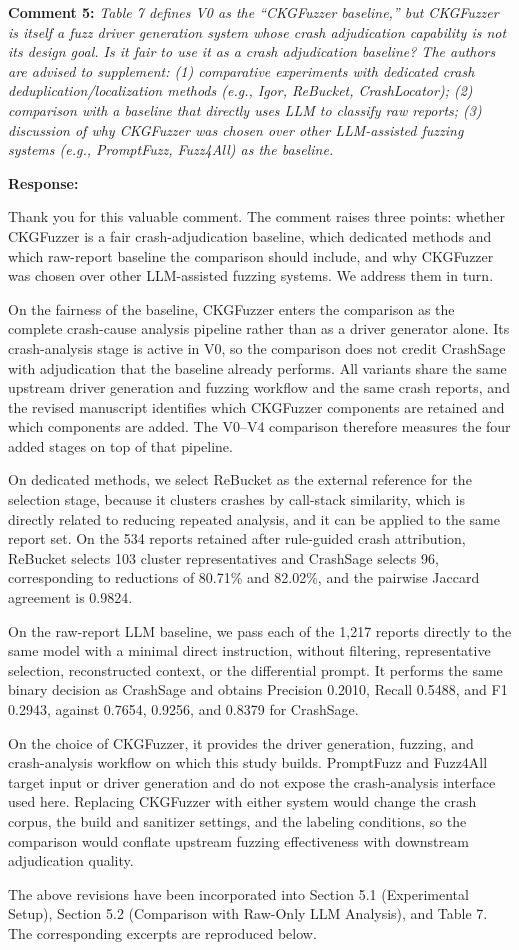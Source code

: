 \documentclass[onecolumn,11pt]{article}
\newcommand{\secc}[2]{\par\mySep \noindent \textsf{\textbf{#1 }}\textit{#2}\par}
\newcommand{\secr}[2]{\par\mySep \noindent \textsf{\textbf{#1 }}{#2}\par}
\newcommand{\mySep}{\vspace{8pt}}
\begin{document}
\secc{Comment 5:}{Table 7 defines V0 as the ``CKGFuzzer baseline,'' but CKGFuzzer is itself a fuzz driver generation system whose crash adjudication capability is not its design goal. Is it fair to use it as a crash adjudication baseline? The authors are advised to supplement: (1) comparative experiments with dedicated crash deduplication/localization methods (e.g., Igor, ReBucket, CrashLocator); (2) comparison with a baseline that directly uses LLM to classify raw reports; (3) discussion of why CKGFuzzer was chosen over other LLM-assisted fuzzing systems (e.g., PromptFuzz, Fuzz4All) as the baseline.}
\secr{Response:}{Thank you for this valuable comment. The comment raises three points: whether CKGFuzzer is a fair crash-adjudication baseline, which dedicated methods and which raw-report baseline the comparison should include, and why CKGFuzzer was chosen over other LLM-assisted fuzzing systems. We address them in turn.

On the fairness of the baseline, CKGFuzzer enters the comparison as the complete crash-cause analysis pipeline rather than as a driver generator alone. Its crash-analysis stage is active in V0, so the comparison does not credit CrashSage with adjudication that the baseline already performs. All variants share the same upstream driver generation and fuzzing workflow and the same crash reports, and the revised manuscript identifies which CKGFuzzer components are retained and which components are added. The V0--V4 comparison therefore measures the four added stages on top of that pipeline.

On dedicated methods, we select ReBucket as the external reference for the selection stage, because it clusters crashes by call-stack similarity, which is directly related to reducing repeated analysis, and it can be applied to the same report set. On the 534 reports retained after rule-guided crash attribution, ReBucket selects 103 cluster representatives and CrashSage selects 96, corresponding to reductions of 80.71\% and 82.02\%, and the pairwise Jaccard agreement is 0.9824.

On the raw-report LLM baseline, we pass each of the 1,217 reports directly to the same model with a minimal direct instruction, without filtering, representative selection, reconstructed context, or the differential prompt. It performs the same binary decision as CrashSage and obtains Precision 0.2010, Recall 0.5488, and F1 0.2943, against 0.7654, 0.9256, and 0.8379 for CrashSage.

On the choice of CKGFuzzer, it provides the driver generation, fuzzing, and crash-analysis workflow on which this study builds. PromptFuzz and Fuzz4All target input or driver generation and do not expose the crash-analysis interface used here. Replacing CKGFuzzer with either system would change the crash corpus, the build and sanitizer settings, and the labeling conditions, so the comparison would conflate upstream fuzzing effectiveness with downstream adjudication quality.

The above revisions have been incorporated into Section 5.1 (Experimental Setup), Section 5.2 (Comparison with Raw-Only LLM Analysis), and Table 7. The corresponding excerpts are reproduced below.}
\end{document}
